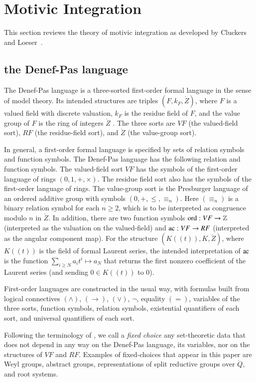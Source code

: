 \section{Motivic Integration}

This section reviews the theory of motivic integration as developed by
Cluckers and Loeser~\cite{cluckers2008constructible}.

\subsection{the Denef-Pas language}

The Denef-Pas language is a three-sorted first-order formal language
in the sense of model theory.  Its intended structures are triples
$(F,k_F,\ring{Z})$, where $F$ is a valued field with discrete
valuation, $k_F$ is the residue field of $F$, and the value group of
$F$ is the ring of integers $\ring{Z}$ .  The three sorts are $VF$
(the valued-field sort), $RF$ (the residue-field sort), and $\ring{Z}$
(the value-group sort).

In general, a first-order formal language is specified by sets of
relation symbols and function symbols.  The Denef-Pas language has the
following relation and function symbols.  The valued-field sort $VF$
has the symbols of the first-order language of rings $(0,1,+,\times)$.
The residue field sort also has the symbols of the first-order
language of rings.  The value-group sort is the Presburger language of
an ordered additive group with symbols $(0,+,\le,\equiv_n)$.  Here
$(\equiv_n)$ is a binary relation symbol for each $n\ge 2$, which is
to be interpreted as congruence modulo $n$ in $\ring{Z}$.  In
addition, there are two function symbols ${\operatorname{ord}}:VF\to\mathbb{Z}$
(interpreted as the valuation on the valued-field) and ${\operatorname{ac}}:VF\to
RF$ (interpreted as the angular component map).  For the structure
$(K((t)),K,\ring{Z})$, where $K((t))$ is the field of formal Laurent
series, the intended interpretation of ${\operatorname{ac}}$ is the function
$\sum_{i\ge N} a_i t^i\mapsto a_N$ that returns the first nonzero
coefficient of the Laurent series (and sending $0\in K((t))$ to $0$).

First-order languages are constructed in the usual way, with formulas
built from logical connectives $(\land)$, $(\to)$, $(\lor)$, $\neg$,
equality $(=)$, variables of the three sorts, function symbols,
relation symbols, existential quantifiers of each sort, and universal
quantifiers of each sort.

Following the terminology of \cite{gordon}, we call a {\it fixed
  choice} any set-theoretic data that does not depend in any way on
the Denef-Pas language, its variables, nor on the structures of $VF$
and $RF$.  Examples of fixed-choices that appear in this paper are
Weyl groups, abstract groups, representations of split reductive
groups over $\ring{Q}$, and root systems.

